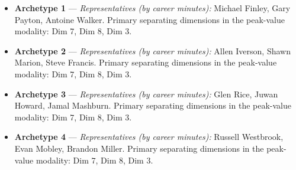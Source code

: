 \begin{itemize}
\item \textbf{Archetype 1} --- \emph{Representatives (by career minutes):} Michael Finley, Gary Payton, Antoine Walker. Primary separating dimensions in the peak-value modality: Dim 7, Dim 8, Dim 3.
\item \textbf{Archetype 2} --- \emph{Representatives (by career minutes):} Allen Iverson, Shawn Marion, Steve Francis. Primary separating dimensions in the peak-value modality: Dim 7, Dim 8, Dim 3.
\item \textbf{Archetype 3} --- \emph{Representatives (by career minutes):} Glen Rice, Juwan Howard, Jamal Mashburn. Primary separating dimensions in the peak-value modality: Dim 7, Dim 8, Dim 3.
\item \textbf{Archetype 4} --- \emph{Representatives (by career minutes):} Russell Westbrook, Evan Mobley, Brandon Miller. Primary separating dimensions in the peak-value modality: Dim 7, Dim 8, Dim 3.
\end{itemize}
